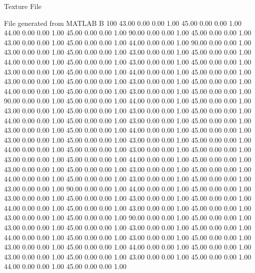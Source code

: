 Texture File

File generated from MATLAB
B 100
   43.00   0.00   0.00   1.00
   45.00   0.00   0.00   1.00
   44.00   0.00   0.00   1.00
   45.00   0.00   0.00   1.00
   90.00   0.00   0.00   1.00
   45.00   0.00   0.00   1.00
   43.00   0.00   0.00   1.00
   45.00   0.00   0.00   1.00
   44.00   0.00   0.00   1.00
   90.00   0.00   0.00   1.00
   43.00   0.00   0.00   1.00
   45.00   0.00   0.00   1.00
   43.00   0.00   0.00   1.00
   45.00   0.00   0.00   1.00
   44.00   0.00   0.00   1.00
   45.00   0.00   0.00   1.00
   43.00   0.00   0.00   1.00
   45.00   0.00   0.00   1.00
   43.00   0.00   0.00   1.00
   45.00   0.00   0.00   1.00
   44.00   0.00   0.00   1.00
   45.00   0.00   0.00   1.00
   43.00   0.00   0.00   1.00
   45.00   0.00   0.00   1.00
   43.00   0.00   0.00   1.00
   45.00   0.00   0.00   1.00
   44.00   0.00   0.00   1.00
   45.00   0.00   0.00   1.00
   43.00   0.00   0.00   1.00
   45.00   0.00   0.00   1.00
   90.00   0.00   0.00   1.00
   45.00   0.00   0.00   1.00
   44.00   0.00   0.00   1.00
   45.00   0.00   0.00   1.00
   43.00   0.00   0.00   1.00
   45.00   0.00   0.00   1.00
   43.00   0.00   0.00   1.00
   45.00   0.00   0.00   1.00
   44.00   0.00   0.00   1.00
   45.00   0.00   0.00   1.00
   43.00   0.00   0.00   1.00
   45.00   0.00   0.00   1.00
   43.00   0.00   0.00   1.00
   45.00   0.00   0.00   1.00
   44.00   0.00   0.00   1.00
   45.00   0.00   0.00   1.00
   43.00   0.00   0.00   1.00
   45.00   0.00   0.00   1.00
   43.00   0.00   0.00   1.00
   45.00   0.00   0.00   1.00
   44.00   0.00   0.00   1.00
   45.00   0.00   0.00   1.00
   43.00   0.00   0.00   1.00
   45.00   0.00   0.00   1.00
   43.00   0.00   0.00   1.00
   45.00   0.00   0.00   1.00
   44.00   0.00   0.00   1.00
   45.00   0.00   0.00   1.00
   43.00   0.00   0.00   1.00
   45.00   0.00   0.00   1.00
   43.00   0.00   0.00   1.00
   45.00   0.00   0.00   1.00
   44.00   0.00   0.00   1.00
   45.00   0.00   0.00   1.00
   43.00   0.00   0.00   1.00
   45.00   0.00   0.00   1.00
   43.00   0.00   0.00   1.00
   90.00   0.00   0.00   1.00
   44.00   0.00   0.00   1.00
   45.00   0.00   0.00   1.00
   43.00   0.00   0.00   1.00
   45.00   0.00   0.00   1.00
   43.00   0.00   0.00   1.00
   45.00   0.00   0.00   1.00
   44.00   0.00   0.00   1.00
   45.00   0.00   0.00   1.00
   43.00   0.00   0.00   1.00
   45.00   0.00   0.00   1.00
   43.00   0.00   0.00   1.00
   45.00   0.00   0.00   1.00
   90.00   0.00   0.00   1.00
   45.00   0.00   0.00   1.00
   43.00   0.00   0.00   1.00
   45.00   0.00   0.00   1.00
   43.00   0.00   0.00   1.00
   45.00   0.00   0.00   1.00
   44.00   0.00   0.00   1.00
   45.00   0.00   0.00   1.00
   43.00   0.00   0.00   1.00
   45.00   0.00   0.00   1.00
   43.00   0.00   0.00   1.00
   45.00   0.00   0.00   1.00
   44.00   0.00   0.00   1.00
   45.00   0.00   0.00   1.00
   43.00   0.00   0.00   1.00
   45.00   0.00   0.00   1.00
   43.00   0.00   0.00   1.00
   45.00   0.00   0.00   1.00
   44.00   0.00   0.00   1.00
   45.00   0.00   0.00   1.00
